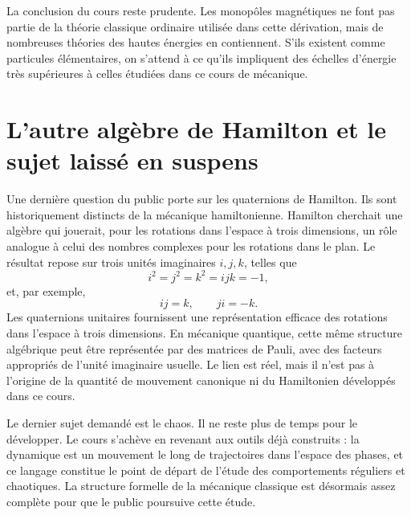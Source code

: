 \begin{classroomqa}
\end{classroomqa}

La conclusion du cours reste prudente. Les monopôles magnétiques ne font pas partie de la théorie classique ordinaire utilisée dans cette dérivation, mais de nombreuses théories des hautes énergies en contiennent. S’ils existent comme particules élémentaires, on s’attend à ce qu’ils impliquent des échelles d’énergie très supérieures à celles étudiées dans ce cours de mécanique.

\section{L’autre algèbre de Hamilton et le sujet laissé en suspens}

Une dernière question du public porte sur les quaternions de Hamilton. Ils sont historiquement distincts de la mécanique hamiltonienne. Hamilton cherchait une algèbre qui jouerait, pour les rotations dans l’espace à trois dimensions, un rôle analogue à celui des nombres complexes pour les rotations dans le plan. Le résultat repose sur trois unités imaginaires \(i,j,k\), telles que
\begin{equation}
  i^2=j^2=k^2=ijk=-1,
\end{equation}
et, par exemple,
\begin{equation}
  ij=k,
  \qquad
  ji=-k.
\end{equation}
Les quaternions unitaires fournissent une représentation efficace des rotations dans l’espace à trois dimensions. En mécanique quantique, cette même structure algébrique peut être représentée par des matrices de Pauli, avec des facteurs appropriés de l’unité imaginaire usuelle. Le lien est réel, mais il n’est pas à l’origine de la quantité de mouvement canonique ni du Hamiltonien développés dans ce cours.

Le dernier sujet demandé est le chaos. Il ne reste plus de temps pour le développer. Le cours s’achève en revenant aux outils déjà construits : la dynamique est un mouvement le long de trajectoires dans l’espace des phases, et ce langage constitue le point de départ de l’étude des comportements réguliers et chaotiques. La structure formelle de la mécanique classique est désormais assez complète pour que le public poursuive cette étude.